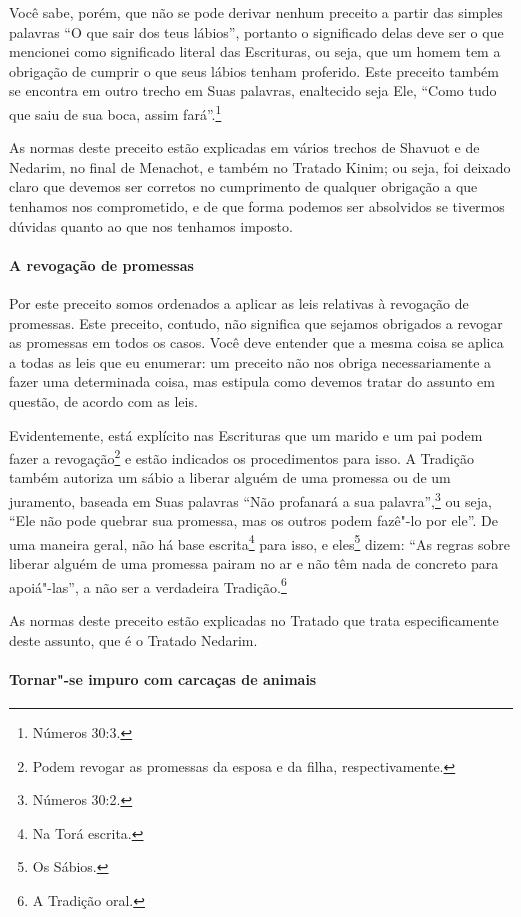 \begin{multicols}{2}
Você sabe, porém, que não se pode derivar nenhum preceito a partir das
simples palavras ``O que sair dos teus lábios'', portanto o significado
delas deve ser o que mencionei como significado literal das Escrituras,
ou seja, que um homem tem a obrigação de cumprir o que seus lábios
tenham proferido. Este preceito também se encontra em outro trecho em
Suas palavras, enaltecido seja Ele, ``Como tudo que saiu de sua boca,
assim fará''.\footnote{Números 30:3.}

As normas deste preceito estão explicadas em vários trechos de Shavuot\starr{}
e de Nedarim\starr, no final de Menachot\starr, e também no Tratado Kinim\starr; ou seja,
foi deixado claro que devemos ser corretos no cumprimento de qualquer
obrigação a que tenhamos nos comprometido, e de que forma podemos ser
absolvidos se tivermos dúvidas quanto ao que nos tenhamos imposto.

\paragraph{A revogação de promessas}

Por este preceito somos ordenados a aplicar as leis relativas à
revogação de promessas. Este preceito, contudo, não significa que
sejamos obrigados a revogar as promessas em todos os casos. Você deve
entender que a mesma coisa se aplica a todas as leis que eu enumerar:
um preceito não nos obriga necessariamente a fazer uma determinada
coisa, mas estipula como devemos tratar do assunto em questão, de acordo
com as leis.

Evidentemente, está explícito nas Escrituras que um marido e um pai
podem fazer a revogação\footnote{Podem revogar as promessas da esposa e da filha, respectivamente.} e estão indicados os
procedimentos para isso. A Tradição também autoriza um sábio a liberar alguém de uma promessa ou de um
juramento, baseada em Suas palavras ``Não profanará a sua palavra'',\footnote{Números 30:2.} ou seja, ``Ele não pode quebrar sua promessa, mas os outros podem
fazê"-lo por ele''. De uma maneira geral, não há base
escrita\footnote{Na Torá\starr{} escrita.} para isso, e eles\footnote{Os Sábios.} dizem: ``As regras sobre liberar alguém de uma promessa pairam no ar e não têm
nada de concreto para apoiá"-las'', a não ser a verdadeira
Tradição.\footnote{A Tradição oral.}

As normas deste preceito estão explicadas no Tratado que trata
especificamente deste assunto, que é o Tratado Nedarim\starr.

\paragraph{Tornar"-se impuro com carcaças de animais}


\end{multicols}
